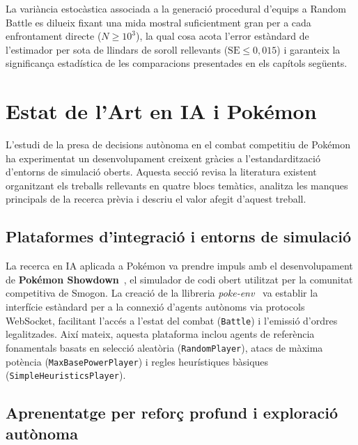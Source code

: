 La variància estocàstica associada a la generació procedural d'equips a Random Battle es dilueix fixant una mida mostral suficientment gran per a cada enfrontament directe ($N \ge 10^3$), la qual cosa acota l'error estàndard de l'estimador per sota de llindars de soroll rellevants ($\mathrm{SE} \le 0{,}015$) i garanteix la significança estadística de les comparacions presentades en els capítols següents.

\section{Estat de l'Art en IA i Pokémon}
\label{sec:estat_art}

L'estudi de la presa de decisions autònoma en el combat competitiu de Pokémon ha experimentat un desenvolupament creixent gràcies a l'estandardització d'entorns de simulació oberts. Aquesta secció revisa la literatura existent organitzant els treballs rellevants en quatre blocs temàtics, analitza les manques principals de la recerca prèvia i descriu el valor afegit d'aquest treball.

\subsection{Plataformes d'integració i entorns de simulació}

La recerca en IA aplicada a Pokémon va prendre impuls amb el desenvolupament de \textbf{Pokémon Showdown}~\cite{pokemon_showdown}, el simulador de codi obert utilitzat per la comunitat competitiva de Smogon. La creació de la llibreria \textit{poke-env}~\cite{poke_env, pokemon_ai_sahovic} va establir la interfície estàndard per a la connexió d'agents autònoms via protocols WebSocket, facilitant l'accés a l'estat del combat (\texttt{Battle}) i l'emissió d'ordres legalitzades. Així mateix, aquesta plataforma inclou agents de referència fonamentals basats en selecció aleatòria (\texttt{RandomPlayer}), atacs de màxima potència (\texttt{MaxBasePowerPlayer}) i regles heurístiques bàsiques (\texttt{SimpleHeuristicsPlayer}).

\subsection{Aprenentatge per reforç profund i exploració autònoma}

